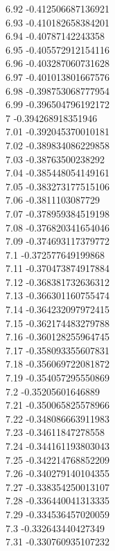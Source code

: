 {6.92	-0.412506687136921\\
6.93	-0.410182658384201\\
6.94	-0.40787142243358\\
6.95	-0.405572912154116\\
6.96	-0.403287060731628\\
6.97	-0.401013801667576\\
6.98	-0.398753068777954\\
6.99	-0.396504796192172\\
7	-0.394268918351946\\
7.01	-0.392045370010181\\
7.02	-0.389834086229858\\
7.03	-0.38763500238292\\
7.04	-0.385448054149161\\
7.05	-0.383273177515106\\
7.06	-0.3811103087729\\
7.07	-0.378959384519198\\
7.08	-0.376820341654046\\
7.09	-0.374693117379772\\
7.1	-0.372577649199868\\
7.11	-0.370473874917884\\
7.12	-0.368381732636312\\
7.13	-0.366301160755474\\
7.14	-0.364232097972415\\
7.15	-0.362174483279788\\
7.16	-0.360128255964745\\
7.17	-0.358093355607831\\
7.18	-0.356069722081872\\
7.19	-0.354057295550869\\
7.2	-0.35205601646889\\
7.21	-0.350065825578966\\
7.22	-0.348086663911983\\
7.23	-0.34611847278558\\
7.24	-0.344161193803043\\
7.25	-0.342214768852209\\
7.26	-0.340279140104355\\
7.27	-0.338354250013107\\
7.28	-0.336440041313335\\
7.29	-0.334536457020059\\
7.3	-0.332643440427349\\
7.31	-0.330760935107232\\
}

